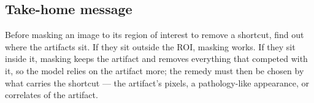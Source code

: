 \subsection{Take-home message}
Before masking an image to its region of interest to remove a shortcut, find out where the artifacts sit. If they sit
outside the ROI, masking works. If they sit inside it, masking keeps the artifact and removes everything that competed
with it, so the model relies on the artifact more; the remedy must then be chosen by what carries the shortcut --- the
artifact's pixels, a pathology-like appearance, or correlates of the artifact.




